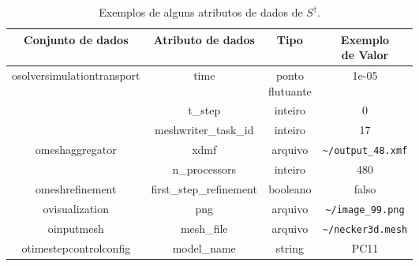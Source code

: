 \begin{table}[htb]
    \centering
    \begin{tabular}{c|c|c|c}
\textbf{Conjunto de dados}                  & \textbf{Atributo de dados} & \textbf{Tipo}   & \makecell{\textbf{Exemplo} \\ \textbf{de Valor}}             \\ \hline
\multirow{3}{*}{osolversimulationtransport} & time                       & \makecell{ponto \\ flutuante} & 1e-05                                  \\ \cline{2-4}
                                            & t\_step                    & inteiro         & 0                                      \\ \cline{2-4}
                                            & meshwriter\_task\_id       & inteiro         & 17                                     \\ \hline
\multirow{2}{*}{omeshaggregator}            & xdmf                       & arquivo         & \texttt{\textasciitilde/output\_48.xmf}             \\ \cline{2-4}
                                            & n\_processors              & inteiro         & 480                                    \\ \hline
omeshrefinement                             & first\_step\_refinement    & booleano        & falso                                  \\ \hline
ovisualization                              & png                        & arquivo         & \texttt{\textasciitilde/image\_99.png} \\ \hline
oinputmesh                                  & mesh\_file                 & arquivo         & \texttt{\textasciitilde/necker3d.mesh}               \\ \hline
otimestepcontrolconfig                      & model\_name                & string          & PC11                                  
    \end{tabular}
    \caption[Exemplos de alguns atributos de dados de \(S^{\dagger}\)]{Exemplos de alguns atributos de dados de \(S^{\dagger}\).}%
    \label{tab:experiments-data-attributes}
\end{table}


